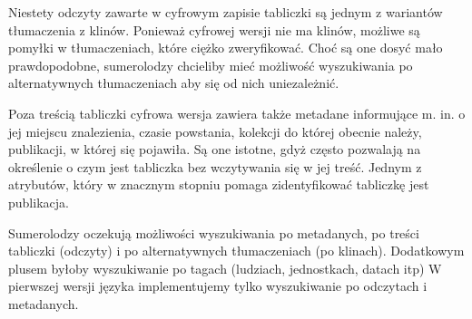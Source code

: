 Niestety odczyty zawarte w cyfrowym zapisie tabliczki są jednym z wariantów tłumaczenia z klinów. 
Ponieważ cyfrowej wersji nie ma klinów, możliwe są pomyłki w tłumaczeniach, które ciężko zweryfikować.
Choć są one dosyć mało prawdopodobne, sumerolodzy chcieliby mieć możliwość wyszukiwania po alternatywnych tłumaczeniach aby się 
od nich uniezależnić.


Poza treścią tabliczki cyfrowa wersja zawiera także metadane informujące m. in. o jej miejscu znalezienia, czasie powstania, 
 kolekcji do której obecnie należy, publikacji, w której się pojawiła. 
Są one istotne, gdyż często pozwalają na określenie o czym jest tabliczka bez wczytywania się w jej treść. 
Jednym z atrybutów, który w znacznym stopniu pomaga zidentyfikować tabliczkę jest publikacja.




Sumerolodzy oczekują możliwości wyszukiwania po metadanych, po treści tabliczki (odczyty) 
i po alternatywnych tłumaczeniach (po klinach).  %
Dodatkowym plusem byłoby wyszukiwanie po tagach (ludziach, jednostkach, datach itp)
W pierwszej wersji języka implementujemy tylko wyszukiwanie po odczytach i metadanych.